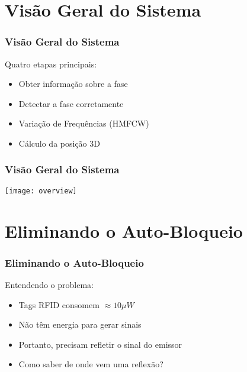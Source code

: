 \section{Visão Geral do Sistema}

\begin{frame}
    \frametitle{Visão Geral do Sistema}

    Quatro etapas principais:

    \begin{itemize}
        \item Obter \alert{informação sobre a fase}
        \item \alert{Detectar a fase} corretamente
        \item \alert{Variação de Frequências} (HMFCW)
        \item \alert{Cálculo da posição 3D}
    \end{itemize}
\end{frame}

\begin{frame}
    \frametitle{Visão Geral do Sistema}

    \begin{center}
        \texttt{[image: overview]}
    \end{center}
\end{frame}

\section{Eliminando o Auto-Bloqueio}

\begin{frame}
    \frametitle{Eliminando o Auto-Bloqueio}

    Entendendo o problema:
    \begin{itemize}
        \item Tags RFID consomem \alert{$\approx{}10\mu{}W$}
        \item Não têm energia para \alert{gerar sinais}
        \item Portanto, precisam \alert{refletir o sinal do emissor}
            \pause
        \item \alert{Como saber de onde vem uma reflexão?}
    \end{itemize}
\end{frame}

